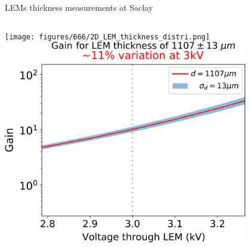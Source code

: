 \documentclass[10pt]{beamer}
\begin{document}
\begin{frame}{LEMs thickness measurements at Saclay}
\begin{scriptsize}
\begin{columns}
\begin{column}{0.48\textwidth}
    				\texttt{[image: figures/666/2D\_LEM\_thickness\_distri.png]}\\\vspace{0.1cm}
    				\vspace{0.3cm}
    				\centering
    				\includegraphics[width=0.8\textwidth]{figures/666/measured_gain_fluctuations.png}
    			\end{column}
    		\end{columns}
    	\end{scriptsize}
    \end{frame}
    
\end{document}
